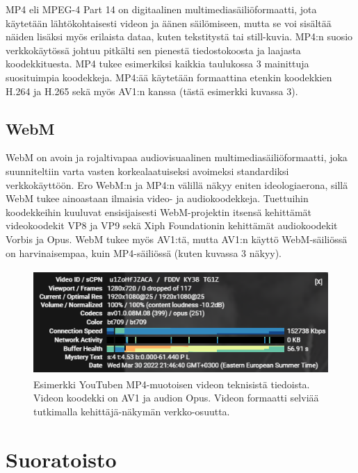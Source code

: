 \documentclass[finnish, 12pt, a4paper, elec, utf8, a-1b, online]{aaltothesis}
\begin{document}
MP4 eli MPEG-4 Part 14 on digitaalinen multimediasäiliöformaatti, jota käytetään lähtökohtaisesti videon ja äänen säilömiseen, mutta se voi sisältää näiden lisäksi myös erilaista dataa, kuten tekstitystä tai still-kuvia. MP4:n suosio verkkokäytössä johtuu pitkälti sen pienestä tiedostokoosta ja laajasta koodekkituesta. MP4 tukee esimerkiksi kaikkia taulukossa 3 mainittuja suosituimpia koodekkeja. MP4:ää käytetään formaattina etenkin koodekkien H.264 ja H.265 sekä myös AV1:n kanssa (tästä esimerkki kuvassa 3). \cite{Codecs}

\subsection*{WebM}

WebM on avoin ja rojaltivapaa audiovisuaalinen multimediasäiliöformaatti, joka suunniteltiin varta vasten korkealaatuiseksi avoimeksi standardiksi verkkokäyttöön. \cite{WebM} Ero WebM:n ja MP4:n välillä näkyy eniten ideologiaerona, sillä WebM tukee ainoastaan ilmaisia video- ja audiokoodekkeja. Tuettuihin koodekkeihin kuuluvat ensisijaisesti WebM-projektin itsensä kehittämät videokoodekit VP8 ja VP9 sekä Xiph Foundationin kehittämät audiokoodekit Vorbis ja Opus. WebM tukee myös AV1:tä, mutta AV1:n käyttö WebM-säiliössä on harvinaisempaa, kuin MP4-säiliössä (kuten kuvassa 3 näkyy). \cite{WebM FAQ}

\begin{figure}[htb]
  \centering
  \includegraphics[height=4cm]{./img/youtube.png}
  \caption{Esimerkki YouTuben MP4-muotoisen videon teknisistä tiedoista. Videon koodekki on AV1 ja audion Opus. Videon formaatti selviää tutkimalla kehittäjä-näkymän verkko-osuutta. \label{kuva3}}
\end{figure}

\clearpage


\section{Suoratoisto}
\end{document}
